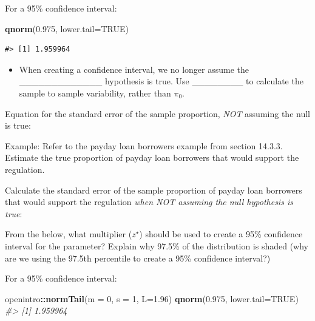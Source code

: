 \documentclass[
]{report}
\newenvironment{Shaded}{\begin{snugshade}}{\end{snugshade}}
\newcommand{\AttributeTok}[1]{\textcolor[rgb]{0.13,0.29,0.53}{#1}}
\newcommand{\CommentTok}[1]{\textcolor[rgb]{0.56,0.35,0.01}{\textit{#1}}}
\newcommand{\ConstantTok}[1]{\textcolor[rgb]{0.56,0.35,0.01}{#1}}
\newcommand{\DecValTok}[1]{\textcolor[rgb]{0.00,0.00,0.81}{#1}}
\newcommand{\FloatTok}[1]{\textcolor[rgb]{0.00,0.00,0.81}{#1}}
\newcommand{\FunctionTok}[1]{\textcolor[rgb]{0.13,0.29,0.53}{\textbf{#1}}}
\newcommand{\NormalTok}[1]{#1}
\newcommand{\SpecialCharTok}[1]{\textcolor[rgb]{0.81,0.36,0.00}{\textbf{#1}}}
\providecommand{\tightlist}{%
  \setlength{\itemsep}{0pt}\setlength{\parskip}{0pt}}
\begin{document}
For a 95\% confidence interval:

\begin{Shaded}
\begin{Highlighting}[]
\FunctionTok{qnorm}\NormalTok{(}\FloatTok{0.975}\NormalTok{, }\AttributeTok{lower.tail=}\ConstantTok{TRUE}\NormalTok{)}
\end{Highlighting}
\end{Shaded}

\begin{verbatim}
#> [1] 1.959964
\end{verbatim}


\begin{itemize}
\tightlist
\item
  When creating a confidence interval, we no longer assume the \_\_\_\_\_\_\_\_\_\_\_\_\_ hypothesis is true. Use \_\_\_\_\_\_\_\_ to calculate the sample to sample variability, rather than \(\pi_0\).
\end{itemize}


Equation for the standard error of the sample proportion, \emph{NOT} assuming the null is true:

\vspace{0.4in}

Example: Refer to the payday loan borrowers example from section 14.3.3. Estimate the true proportion of payday loan borrowers that would support the regulation.

Calculate the standard error of the sample proportion of payday loan borrowers that would support the regulation \emph{when NOT assuming the null hypothesis is true}:

\vspace{0.4in}

From the below, what multiplier (\(z^\star\)) should be used to create a 95\% confidence interval for the parameter? Explain why 97.5\% of the distribution is shaded (why are we using the 97.5th percentile to create a 95\% confidence interval?)

\vspace{0.3in}

For a 95\% confidence interval:

\begin{Shaded}
\begin{Highlighting}[]
\NormalTok{openintro}\SpecialCharTok{::}\FunctionTok{normTail}\NormalTok{(}\AttributeTok{m =} \DecValTok{0}\NormalTok{, }\AttributeTok{s =} \DecValTok{1}\NormalTok{, }\AttributeTok{L=}\FloatTok{1.96}\NormalTok{)}
\FunctionTok{qnorm}\NormalTok{(}\FloatTok{0.975}\NormalTok{, }\AttributeTok{lower.tail=}\ConstantTok{TRUE}\NormalTok{)}
\CommentTok{\#\textgreater{} [1] 1.959964}
\end{Highlighting}
\end{Shaded}
\end{document}
